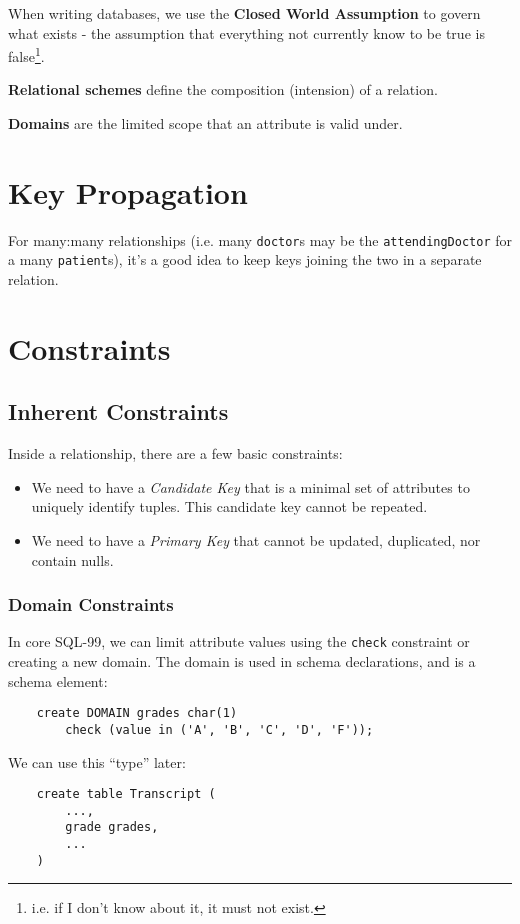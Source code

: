                 When writing databases, we use the \textbf{Closed World Assumption} to govern what exists - the assumption that everything not currently know to be true is false\footnote{i.e. if I don't know about it, it must not exist.}.

                \textbf{Relational schemes} define the composition (intension) of a relation.

                \textbf{Domains} are the limited scope that an attribute is valid under.
            \section{Key Propagation} %
            \label{sec:key_propogation}
                For many:many relationships (i.e. many \verb|doctor|s may be the \verb|attendingDoctor| for a many \verb|patient|s), it's a good idea to keep keys joining the two in a separate relation.
            \section{Constraints} %
            \label{sec:constraints}
                \subsection{Inherent Constraints} %
                \label{sub:inherent_constraints}
                    Inside a relationship, there are a few basic constraints:
                    \begin{itemize}
                        \item We need to have a \textit{Candidate Key} that is a minimal set of attributes to uniquely identify tuples.
                        This candidate key cannot be repeated.
                        \item We need to have a \textit{Primary Key} that cannot be updated, duplicated, nor contain nulls.
                    \end{itemize}
                \subsubsection{Domain Constraints} %
                \label{ssub:domain_constraints}
                    In core SQL-99, we can limit attribute values using the \verb|check| constraint or creating a new domain.
                    The domain is used in schema declarations, and is a schema element:
                    \begin{verbatim}
    create DOMAIN grades char(1)
        check (value in ('A', 'B', 'C', 'D', 'F'));
                    \end{verbatim}
                    We can use this ``type'' later:
                    \begin{verbatim}
    create table Transcript (
        ...,
        grade grades,
        ...
    )
                    \end{verbatim}
